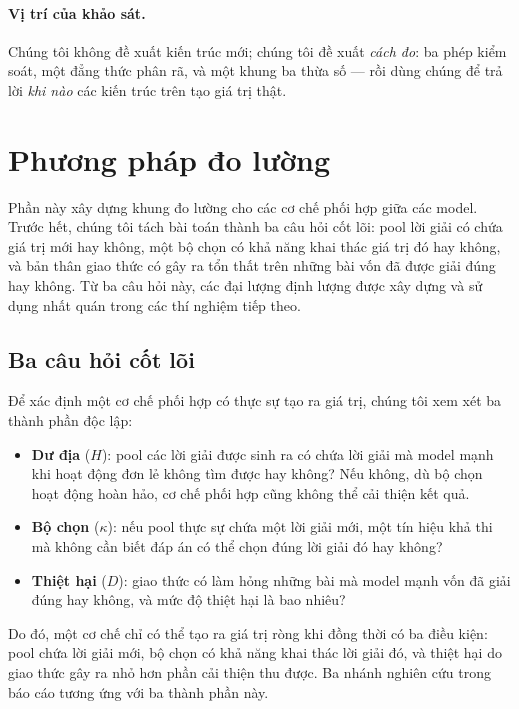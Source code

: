 \documentclass[12pt,a4paper]{article}
\begin{document}
\paragraph{Vị trí của khảo sát.} Chúng tôi không đề xuất kiến trúc mới; chúng tôi đề xuất
\emph{cách đo}: ba phép kiểm soát, một đẳng thức phân rã, và một khung ba thừa số --- rồi dùng
chúng để trả lời \emph{khi nào} các kiến trúc trên tạo giá trị thật.

\section{Phương pháp đo lường}\label{sec:framework}

Phần này xây dựng khung đo lường cho các cơ chế phối hợp giữa các model. Trước hết, chúng tôi
tách bài toán thành ba câu hỏi cốt lõi: pool lời giải có chứa giá trị mới hay không, một bộ chọn
có khả năng khai thác giá trị đó hay không, và bản thân giao thức có gây ra tổn thất trên những
bài vốn đã được giải đúng hay không. Từ ba câu hỏi này, các đại lượng định lượng được xây dựng
và sử dụng nhất quán trong các thí nghiệm tiếp theo.

\subsection{Ba câu hỏi cốt lõi}\label{sec:threeq}

Để xác định một cơ chế phối hợp có thực sự tạo ra giá trị, chúng tôi xem xét ba thành phần độc
lập:

\begin{itemize}\itemsep1pt
\item \textbf{Dư địa} ($H$): pool các lời giải được sinh ra có chứa lời giải mà model mạnh
      khi hoạt động đơn lẻ không tìm được hay không? Nếu không, dù bộ chọn hoạt động hoàn hảo,
      cơ chế phối hợp cũng không thể cải thiện kết quả.
\item \textbf{Bộ chọn} ($\kappa$): nếu pool thực sự chứa một lời giải mới, một tín hiệu khả
      thi mà không cần biết đáp án có thể chọn đúng lời giải đó hay không?
\item \textbf{Thiệt hại} ($D$): giao thức có làm hỏng những bài mà model mạnh vốn đã giải
      đúng hay không, và mức độ thiệt hại là bao nhiêu?
\end{itemize}

Do đó, một cơ chế chỉ có thể tạo ra giá trị ròng khi đồng thời có ba điều kiện: pool chứa lời
giải mới, bộ chọn có khả năng khai thác lời giải đó, và thiệt hại do giao thức gây ra nhỏ hơn
phần cải thiện thu được. Ba nhánh nghiên cứu trong báo cáo tương ứng với ba thành phần này.
\end{document}
